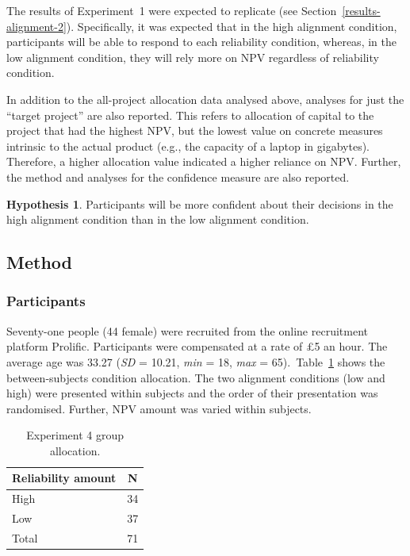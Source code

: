 \documentclass[a4paper, nobind, dvipsnames]{templates/ociamthesis}
\theoremstyle{definition}
\theoremstyle{definition}
\theoremstyle{definition}
\theoremstyle{definition}
\newtheorem{hypothesis}{Hypothesis}[chapter]
\theoremstyle{remark}
\begin{document}
The results of Experiment~1 were expected to replicate (see
Section~\ref{results-alignment-2}). Specifically, it was expected that in the
high alignment condition, participants will be able to respond to each
reliability condition, whereas, in the low alignment condition, they will rely
more on NPV regardless of reliability condition.

In addition to the all-project allocation data analysed above, analyses for just
the ``target project'' are also reported. This refers to allocation of capital to
the project that had the highest NPV, but the lowest value on concrete measures
intrinsic to the actual product (e.g., the capacity of a laptop in gigabytes).
Therefore, a higher allocation value indicated a higher reliance on NPV.
Further, the method and analyses for the confidence measure are also reported.

\begin{hypothesis}
\protect\hypertarget{hyp:confidence-alignment-alignment-1}{}{\label{hyp:confidence-alignment-alignment-1} }Participants will be more confident about their decisions in the high alignment
condition than in the low alignment condition.
\end{hypothesis}

\hypertarget{method-alignment-1}{%
\subsection{Method}\label{method-alignment-1}}

\subsubsection{Participants}

Seventy-one people (44 female) were recruited from the online recruitment platform Prolific. Participants were compensated at a rate of £5 an hour. The average age was 33.27 (\emph{SD} = 10.21, \emph{min} = 18, \emph{max} = 65).~Table~\ref{tab:condition-allocation-alignment-1}
shows the between-subjects condition allocation. The two alignment conditions
(low and high) were presented within subjects and the order of their
presentation was randomised. Further, NPV amount was varied within subjects.

\begin{table}[tbp]

\begin{center}
\begin{threeparttable}

\caption{\label{tab:condition-allocation-alignment-1}Experiment 4 group allocation.}

\begin{tabular}{ll}
\toprule
Reliability amount & \multicolumn{1}{c}{N}\\
\midrule
High & 34\\
Low & 37\\
Total & 71\\
\bottomrule
\end{tabular}

\end{threeparttable}
\end{center}

\end{table}
\end{document}
